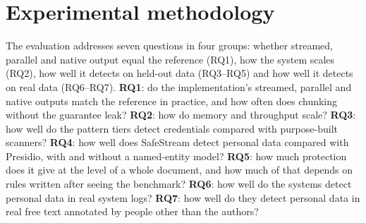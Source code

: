 \section{Experimental methodology}\label{sec:setup}

The evaluation addresses seven questions in four groups: whether streamed, parallel and native output equal the reference (RQ1), how the system scales (RQ2), how well it detects on held-out data (RQ3--RQ5) and how well it detects on real data (RQ6--RQ7). \textbf{RQ1}: do the implementation's streamed, parallel and native outputs match the reference in practice, and how often does chunking without the guarantee leak? \textbf{RQ2}: how do memory and throughput scale? \textbf{RQ3}: how well do the pattern tiers detect credentials compared with purpose-built scanners? \textbf{RQ4}: how well does SafeStream detect personal data compared with Presidio, with and without a named-entity model? \textbf{RQ5}: how much protection does it give at the level of a whole document, and how much of that depends on rules written after seeing the benchmark? \textbf{RQ6}: how well do the systems detect personal data in real system logs? \textbf{RQ7}: how well do they detect personal data in real free text annotated by people other than the authors?

